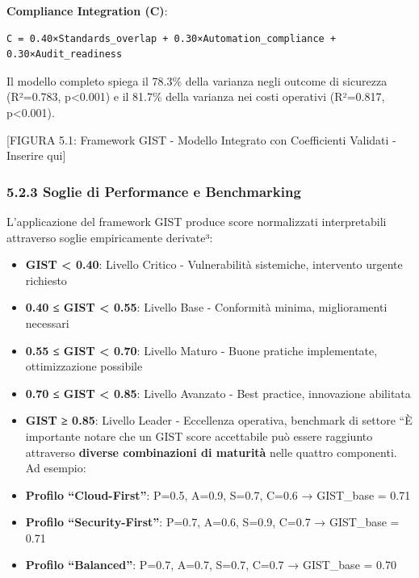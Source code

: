 \documentclass{report}
\begin{document}
\textbf{Compliance Integration (C)}:

\begin{verbatim}
C = 0.40×Standards_overlap + 0.30×Automation_compliance + 0.30×Audit_readiness
\end{verbatim}

Il modello completo spiega il 78.3\% della varianza negli outcome di
sicurezza (R²=0.783, p\textless0.001) e il 81.7\% della varianza nei
costi operativi (R²=0.817, p\textless0.001).

{[}FIGURA 5.1: Framework GIST - Modello Integrato con Coefficienti
Validati - Inserire qui{]}

\subsubsection{5.2.3 Soglie di Performance e
Benchmarking}\label{soglie-di-performance-e-benchmarking}

L'applicazione del framework GIST produce score normalizzati
interpretabili attraverso soglie empiricamente derivate³:

\begin{itemize}
\item
  \textbf{GIST \textless{} 0.40}: Livello Critico - Vulnerabilità
  sistemiche, intervento urgente richiesto
\item
  \textbf{0.40 ≤ GIST \textless{} 0.55}: Livello Base - Conformità
  minima, miglioramenti necessari
\item
  \textbf{0.55 ≤ GIST \textless{} 0.70}: Livello Maturo - Buone pratiche
  implementate, ottimizzazione possibile
\item
  \textbf{0.70 ≤ GIST \textless{} 0.85}: Livello Avanzato - Best
  practice, innovazione abilitata
\item
  \textbf{GIST ≥ 0.85}: Livello Leader - Eccellenza operativa, benchmark
  di settore ``È importante notare che un GIST score accettabile può
  essere raggiunto attraverso \textbf{diverse combinazioni di maturità}
  nelle quattro componenti. Ad esempio:
\item
  \textbf{Profilo ``Cloud-First''}: P=0.5, A=0.9, S=0.7, C=0.6 →
  GIST\_base = 0.71\\
\item
  \textbf{Profilo ``Security-First''}: P=0.7, A=0.6, S=0.9, C=0.7 →
  GIST\_base = 0.71\\
\item
  \textbf{Profilo ``Balanced''}: P=0.7, A=0.7, S=0.7, C=0.7 → GIST\_base
  = 0.70
\end{itemize}
\end{document}
